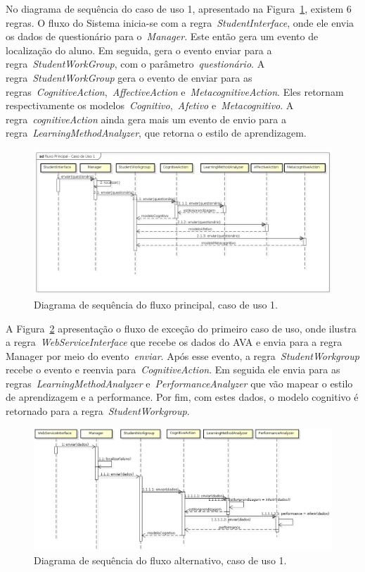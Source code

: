 No diagrama de sequência do caso de uso 1, apresentado na Figura~\ref{fig:dss-uc1-fluxo-principal}, existem 6 regras. O fluxo do Sistema inicia-se com a regra~\emph{StudentInterface}, onde ele envia os dados de questionário para o~\emph{Manager}. Este então gera um evento de localização do aluno. Em seguida, gera o evento enviar para a regra~\emph{StudentWorkGroup}, com o parâmetro~\emph{questionário}. A regra~\emph{StudentWorkGroup} gera o evento de enviar para as regras~\emph{CognitiveAction},~\emph{AffectiveAction} e~\emph{MetacognitiveAction}. Eles retornam respectivamente os modelos~\emph{Cognitivo},~\emph{Afetivo} e~\emph{Metacognitivo}. A regra~\emph{cognitiveAction} ainda gera mais um evento de envio para a regra~\emph{LearningMethodAnalyzer}, que retorna o estilo de aprendizagem.

\begin{figure}
	\centering
	\includegraphics[scale=0.52]{images/dss-uc1-fluxo-principal.png}
	\caption{Diagrama de sequência do fluxo principal, caso de uso 1.}
	\label{fig:dss-uc1-fluxo-principal}
\end{figure}

A Figura~\ref{fig:dss-uc1-fluxo-alternativo} apresentação o fluxo de exceção do primeiro caso de uso, onde ilustra a regra~\emph{WebServiceInterface} que recebe os dados do AVA e envia para a regra Manager por meio do evento~\emph{enviar}. Após esse evento, a regra~\emph{StudentWorkgroup} recebe o evento e reenvia para~\emph{CognitiveAction}. Em seguida ele envia para as regras~\emph{LearningMethodAnalyzer} e~\emph{PerformanceAnalyzer} que vão mapear o estilo de aprendizagem e a performance. Por fim, com estes dados, o modelo cognitivo é retornado para a regra~\emph{StudentWorkgroup}.

\begin{figure}
	\includegraphics[scale=0.52]{images/dss-uc1-fluxo-alternativo.png}
	\caption{Diagrama de sequência do fluxo alternativo, caso de uso 1.}
	\label{fig:dss-uc1-fluxo-alternativo}
\end{figure}

